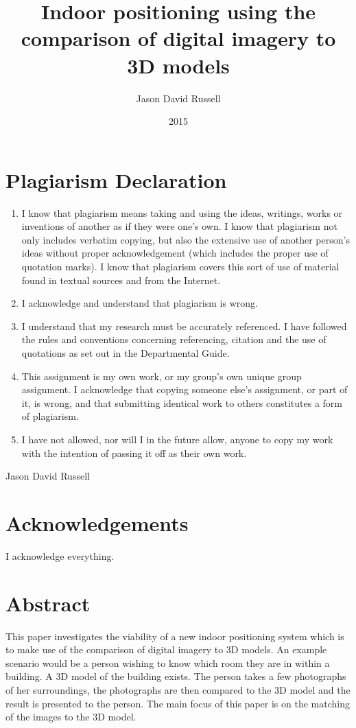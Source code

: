 \documentclass[11pt,a4paper]{report}
\title{Indoor positioning using the comparison of digital imagery to 3D models}
\date{2015}
\author{Jason David Russell}
\begin{document}
\maketitle
\thispagestyle{empty}

\setcounter{page}{0}

\newpage
\chapter*{Plagiarism Declaration}
	\begin{enumerate}
		\item
			I know that plagiarism means taking and using the ideas, writings, works or inventions of another as if they were one's own. I know that plagiarism not only includes verbatim copying, but also the extensive use of another person's ideas without proper acknowledgement (which includes the proper use of quotation marks). I know that plagiarism covers this sort of use of material found in textual sources and from the Internet.
		\item
			I acknowledge and understand that plagiarism is wrong.
		\item
			I understand that my research must be accurately referenced. I have followed the rules and conventions concerning referencing, citation and the use of quotations as set out in the Departmental Guide.
		\item
			This assignment is my own work, or my group's own unique group assignment.
			I acknowledge that copying someone else's assignment, or part of it, is wrong, and that submitting identical work to others constitutes a form of plagiarism.
		\item
			I have not allowed, nor will I in the future allow, anyone to copy my work with the intention of passing it off as their own work.
	\end{enumerate}
	Jason David Russell

\newpage
\chapter*{Acknowledgements}
	I acknowledge everything.

\newpage
\chapter*{Abstract}
	This paper investigates the viability of a new indoor positioning system which is to make use of the comparison of digital imagery to 3D models. An example scenario would be a person wishing to know which room they are in within a building. A 3D model of the building exists. The person takes a few photographs of her surroundings, the photographs are then compared to the 3D model and the result is presented to the person. The main focus of this paper is on the matching of the images to the 3D model.
\end{document}
